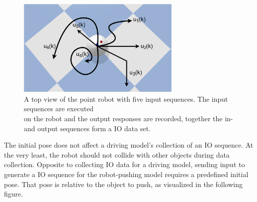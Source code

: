 \begin{figure}[H]
    \centering
    \includegraphics[width=0.7\textwidth]{figures/required_background/collect_io_robot}
    \caption{A top view of the point robot with five input sequences. The input sequences are executed\\on the robot and the output responses are recorded, together the in- and output sequences form a \ac{IO} data set.}%
    \label{fig:collect_io_robot}
\end{figure}

The initial pose does not affect a driving model's collection of an \ac{IO} sequence. At the very least, the robot should not collide with other objects during data collection. Opposite to collecting \ac{IO} data for a driving model, sending input to generate a \ac{IO} sequence for the robot-pushing model requires a predefined initial pose. That pose is relative to the object to push, as visualized in the following figure.\bs

